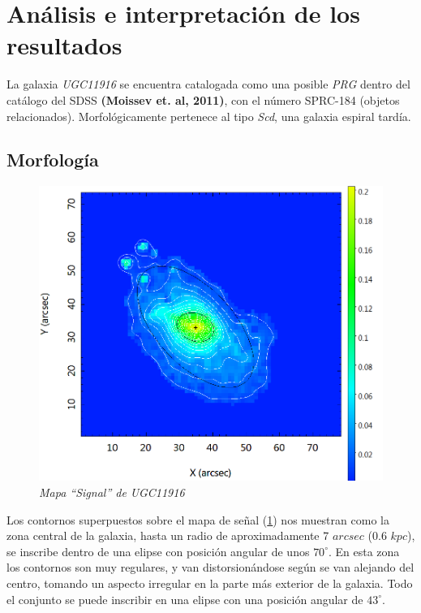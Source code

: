 \documentclass{article}
\begin{document}
\section{Análisis e interpretación de los resultados}
La galaxia \emph{UGC11916} se encuentra catalogada como una posible \emph{PRG} dentro del catálogo del SDSS \textbf{(Moissev et. al, 2011)}, con el número SPRC-184 (objetos relacionados). Morfológicamente pertenece al tipo \emph{Scd}, una galaxia espiral tardía.

\subsection{Morfología}

\begin{minipage}[b]{0.4\linewidth}
\begin{figure}[H]
\includegraphics[scale=.20]{imagen3.png}
\centering	
\caption{\emph{Mapa ``Signal'' de UGC11916}}
\label{figura 3}
\end{figure}
\end{minipage} \hfill\begin{minipage}[b]{0.5\linewidth} Los contornos superpuestos sobre el mapa de señal (\ref{figura 3}) nos muestran como la zona central de la galaxia, hasta un radio de aproximadamente 7 $arcsec$ (0.6 $kpc$), se inscribe dentro de una elipse con posición angular de unos $70^{\circ}$. En esta zona los contornos son muy regulares, y van distorsionándose según se van alejando del centro, tomando un aspecto irregular en la parte más exterior de la galaxia. Todo el conjunto se puede inscribir en una elipse con una posición angular de $43^{\circ}$.

\end{minipage}\\







\end{document}
